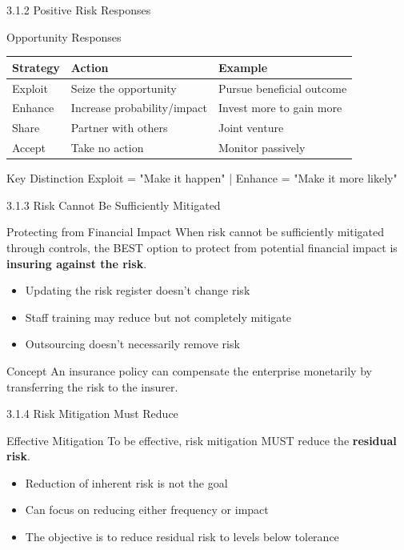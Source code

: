 \documentclass{beamer}
\begin{document}
	\begin{frame}{3.1.2 Positive Risk Responses}
		\begin{block}{Opportunity Responses}
			\begin{tabular}{|p{2.5cm}|p{4cm}|p{5cm}|}
				\hline
				\textbf{Strategy} & \textbf{Action} & \textbf{Example} \\
				\hline
				Exploit & Seize the opportunity & Pursue beneficial outcome \\
				\hline
				Enhance & Increase probability/impact & Invest more to gain more \\
				\hline
				Share & Partner with others & Joint venture \\
				\hline
				Accept & Take no action & Monitor passively \\
				\hline
			\end{tabular}
		\end{block}
		\begin{exampleblock}{Key Distinction}
			Exploit = "Make it happen" | Enhance = "Make it more likely"
		\end{exampleblock}
	\end{frame}
	
	\begin{frame}{3.1.3 Risk Cannot Be Sufficiently Mitigated}
		\begin{block}{Protecting from Financial Impact}
			When risk cannot be sufficiently mitigated through controls, the BEST option to protect from potential financial impact is \textbf{insuring against the risk}.
		\end{block}
		\begin{itemize}
			\item Updating the risk register doesn't change risk
			\item Staff training may reduce but not completely mitigate
			\item Outsourcing doesn't necessarily remove risk
		\end{itemize}
		\begin{exampleblock}{Concept}
			An insurance policy can compensate the enterprise monetarily by transferring the risk to the insurer.
		\end{exampleblock}
	\end{frame}
	
	\begin{frame}{3.1.4 Risk Mitigation Must Reduce}
		\begin{block}{Effective Mitigation}
			To be effective, risk mitigation MUST reduce the \textbf{residual risk}.
		\end{block}
		\begin{itemize}
			\item Reduction of inherent risk is not the goal
			\item Can focus on reducing either frequency or impact
			\item The objective is to reduce residual risk to levels below tolerance
		\end{itemize}
	\end{frame}
	
\end{document}
